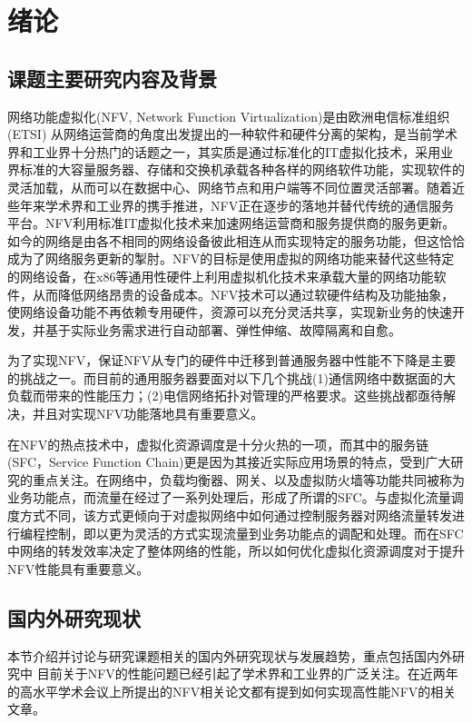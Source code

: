 \chapter{绪论}
\label{chap: Introduction}


\section{课题主要研究内容及背景}
网络功能虚拟化(NFV, Network Function Virtualization)是由欧洲电信标准组织 (ETSI) 从网络运营商的角度出发提出的一种软件和硬件分离的架构，是当前学术界和工业界十分热门的话题之一，其实质是通过标准化的IT虚拟化技术，采用业界标准的大容量服务器、存储和交换机承载各种各样的网络软件功能，实现软件的灵活加载，从而可以在数据中心、网络节点和用户端等不同位置灵活部署。随着近些年来学术界和工业界的携手推进，NFV正在逐步的落地并替代传统的通信服务平台。NFV利用标准IT虚拟化技术来加速网络运营商和服务提供商的服务更新。如今的网络是由各不相同的网络设备彼此相连从而实现特定的服务功能，但这恰恰成为了网络服务更新的掣肘。NFV的目标是使用虚拟的网络功能来替代这些特定的网络设备，在x86等通用性硬件上利用虚拟机化技术来承载大量的网络功能软件，从而降低网络昂贵的设备成本。NFV技术可以通过软硬件结构及功能抽象，使网络设备功能不再依赖专用硬件，资源可以充分灵活共享，实现新业务的快速开发，并基于实际业务需求进行自动部署、弹性伸缩、故障隔离和自愈。

为了实现NFV，保证NFV从专门的硬件中迁移到普通服务器中性能不下降是主要的挑战之一。而目前的通用服务器要面对以下几个挑战\cite{}(1)通信网络中数据面的大负载而带来的性能压力；(2)电信网络拓扑对管理的严格要求。这些挑战都亟待解决，并且对实现NFV功能落地具有重要意义。

在NFV的热点技术中，虚拟化资源调度是十分火热的一项，而其中的服务链(SFC，Service Function Chain)更是因为其接近实际应用场景的特点，受到广大研究的重点关注\cite{}。在网络中，负载均衡器、网关、以及虚拟防火墙等功能共同被称为业务功能点，而流量在经过了一系列处理后，形成了所谓的SFC。与虚拟化流量调度方式不同，该方式更倾向于对虚拟网络中如何通过控制服务器对网络流量转发进行编程控制，即以更为灵活的方式实现流量到业务功能点的调配和处理。而在SFC中网络的转发效率决定了整体网络的性能，所以如何优化虚拟化资源调度对于提升NFV性能具有重要意义。

\section{国内外研究现状}
本节介绍并讨论与研究课题相关的国内外研究现状与发展趋势，重点包括国内外研究中
目前关于NFV的性能问题已经引起了学术界和工业界的广泛关注。在近两年的高水平学术会议上所提出的NFV相关论文都有提到如何实现高性能NFV的相关文章。

